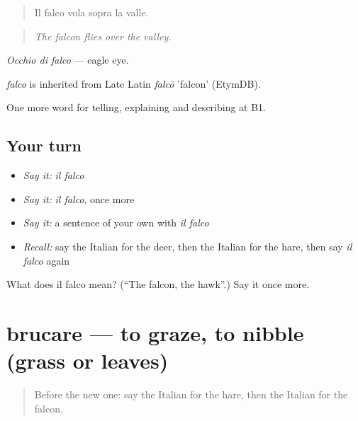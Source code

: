 \begin{quote}
Il falco vola sopra la valle.
\end{quote}

\begin{quote}
\emph{The falcon flies over the valley.}
\end{quote}

\emph{Occhio di falco} — eagle eye.

\begin{cousinweb}
\emph{falco} is inherited from Late Latin \emph{falcō} 'falcon' (EtymDB).
\end{cousinweb}

\begin{grammarlens}[title={What you've built}]
One more word for telling, explaining and describing at B1.
\end{grammarlens}

\subsection*{Your turn}
\begin{itemize}
\raggedright
  \item \emph{Say it:} \emph{il falco}
  \item \emph{Say it:} \emph{il falco}, once more
  \item \emph{Say it:} a sentence of your own with \emph{il falco}
  \item \emph{Recall:} say the Italian for the deer, then the Italian for the hare, then say \emph{il falco} again
\end{itemize}

\begin{tcolorbox}[breakable,colback=teal!4,colframe=teal!35!black,title={Before you move on}]
What does il falco mean? (\textquotedblleft{}The falcon, the hawk\textquotedblright{}.) Say it once more.
\end{tcolorbox}
\section[brucare]{brucare — to graze, to nibble (grass or leaves)}

\label{lesson:IT-C464-brucare}



\begin{quote}
Before the new one: say the Italian for the hare, then the Italian for the falcon.
\end{quote}

